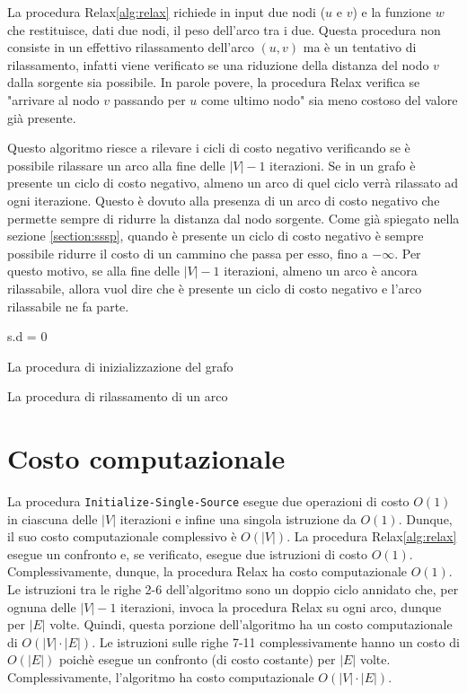 \documentclass[12pt,a4paper]{book} %
\begin{document}
	La procedura Relax\ref{alg:relax} richiede in input due nodi ($u$ e $v$) e la funzione $w$ che restituisce, dati due nodi, il peso dell'arco tra i due. Questa procedura non consiste in un effettivo rilassamento dell'arco $(u,v)$ ma è un tentativo di rilassamento, infatti viene verificato se una riduzione della distanza del nodo $v$ dalla sorgente sia possibile. In parole povere, la procedura Relax verifica se "arrivare al nodo $v$ passando per $u$ come ultimo nodo" sia meno costoso del valore già presente.
	
	Questo algoritmo riesce a rilevare i cicli di costo negativo verificando se è possibile rilassare un arco alla fine delle $|V|-1$ iterazioni. Se in un grafo è presente un ciclo di costo negativo, almeno un arco di quel ciclo verrà rilassato ad ogni iterazione. Questo è dovuto alla presenza di un arco di costo negativo che permette sempre di ridurre la distanza dal nodo sorgente. Come già spiegato nella sezione \ref{section:sssp}, quando è presente un ciclo di costo negativo è sempre possibile ridurre il costo di un cammino che passa per esso, fino a $-\infty$. Per questo motivo, se alla fine delle $|V|-1$ iterazioni, almeno un arco è ancora rilassabile, allora vuol dire che è presente un ciclo di costo negativo e l'arco rilassabile ne fa parte.

	\begin{algorithm}[H]
		\label{alg:init}
		s.d = 0\;
		\caption{La procedura di inizializzazione del grafo}
	\end{algorithm}

	\begin{algorithm}[H]
		\label{alg:relax}
		\caption{La procedura di rilassamento di un arco}
	\end{algorithm}

	\section{Costo computazionale}
	La procedura \texttt{Initialize-Single-Source} esegue due operazioni di costo $O(1)$ in ciascuna delle $|V|$ iterazioni e infine una singola istruzione da $O(1)$. Dunque, il suo costo computazionale complessivo è $O(|V|)$. La procedura Relax\ref{alg:relax} esegue un confronto e, se verificato, esegue due istruzioni di costo $O(1)$. Complessivamente, dunque, la procedura Relax ha costo computazionale $O(1)$. Le istruzioni tra le righe 2-6 dell'algoritmo sono un doppio ciclo annidato che, per ognuna delle $|V|-1$ iterazioni, invoca la procedura Relax su ogni arco, dunque per $|E|$ volte. Quindi, questa porzione dell'algoritmo ha un costo computazionale di $O(|V|\cdot |E|)$. Le istruzioni sulle righe 7-11 complessivamente hanno un costo di $O(|E|)$ poichè esegue un confronto (di costo costante) per $|E|$ volte. Complessivamente, l'algoritmo ha costo computazionale $O(|V|\cdot |E|)$.
	
\end{document}
